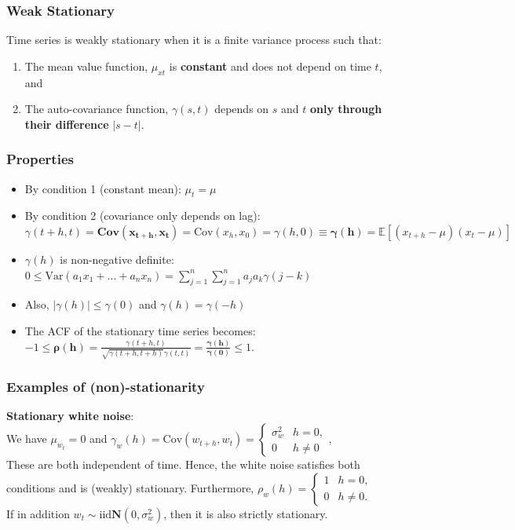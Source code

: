 \documentclass[11pt]{article}
\begin{document}
\subsubsection{Weak Stationary}
\noindent Time series is weakly stationary when it is a finite variance process such that:
\begin{enumerate}
    \item The mean value function, $\mu_{xt}$ is \textbf{constant} and does not depend on time $t$, and
    \item The auto-covariance function, $\gamma(s,t)$ depends on $s$ and $t$ \textbf{only through their difference} $|s-t|$.
\end{enumerate}

\subsubsection{Properties}
\begin{itemize}
    \item By condition 1 (constant mean): $\mu_t = \mu$
    \item By condition 2 (covariance only depends on lag): $\gamma(t+h, t) = \textbf{Cov}\boldsymbol{(x_{t+h}, x_t)} = \text{Cov}(x_h, x_0) = \gamma(h,0) \equiv \boldsymbol{\gamma(h)} = \mathbb{E}[(x_{t+h} - \mu)(x_t - \mu)]$
    \item $\gamma(h)$ is non-negative definite: $0 \leq \text{Var}(a_1x_1 + ... + a_nx_n) = \sum_{j=1}^n{\sum_{j=1}^{n}{a_ja_k\gamma(j-k)}}$
    \item Also, $|\gamma(h)| \leq \gamma(0)$ and $\gamma(h) = \gamma(-h)$
    \item The ACF of the stationary time series becomes: $-1 \leq \boldsymbol{\rho(h)} = \frac{\gamma(t+h,t)}{\sqrt{\gamma(t+h, t+h)}\gamma(t,t)} = \boldsymbol{\frac{\gamma(h)}{\gamma(0)}} \leq 1$.
\end{itemize}

\subsubsection*{Examples of (non)-stationarity}
\noindent \textbf{Stationary white noise}: \\
\noindent We have $\mu_{w_t} = 0$ and $\gamma_w(h) = \text{Cov}(w_{t+h}, w_t) = \begin{cases}
    \sigma_w^2 & h=0, \\ 0 & h \neq 0
\end{cases}$, \\
\noindent These are both independent of time. Hence, the white noise satisfies both conditions and is (weakly) stationary. Furthermore, $\rho_w(h) = \begin{cases}
    1 & h=0, \\ 0 & h \neq 0.
\end{cases}$ \\
\noindent If in addition $w_t \sim \text{iid} \textbf{N}(0, \sigma_w^2)$, then it is also strictly stationary. \\
\end{document}
